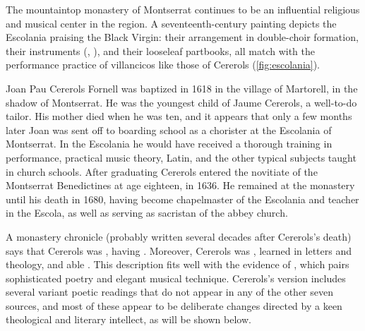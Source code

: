 The mountaintop monastery of Montserrat continues to be an influential
religious and musical center in the region. 
A seventeenth-century painting depicts the Escolania praising the Black Virgin:
their arrangement in double-choir formation, their instruments (,
), and their looseleaf partbooks, all match with the performance
practice of villancicos like those of Cererols (\cref{fig:escolania}).


Joan Pau Cererols Fornell was baptized in 1618 in the village of Martorell, in
the shadow of Montserrat.%
    \Autocite{Balanza:CererolsFamily}
He was the youngest child of Jaume Cererols, a well-to-do tailor.
His mother died when he was ten, and it appears that only a few months later
Joan was sent off to boarding school as a chorister at the Escolania of
Montserrat.%
    \Autocite{Balanza:CererolsFamily}
In the Escolania he would have received a thorough training in performance,
practical music theory, Latin, and the other typical subjects taught in church
schools.
After graduating Cererols entered the novitiate of the Montserrat Benedictines
at age eighteen, in 1636.
He remained at the monastery until his death in 1680, having become chapelmaster
of the Escolania and teacher in the Escola, as well as serving as sacristan of
the abbey church.

A monastery chronicle (probably written several decades after Cererols's death)
says that Cererols was , having .
Moreover, Cererols was , learned in letters and
theology, and able .%
    \Autocite
    [{\XXX[original]}]
    [7, note 2]
    {Estrada:CererolsBio}
This description fits well with the evidence of ,
which pairs sophisticated poetry and elegant musical technique.
Cererols's version includes several variant poetic readings that do not appear
in any of the other seven sources, and most of these appear to be deliberate
changes directed by a keen theological and literary intellect, as will be shown
below.

